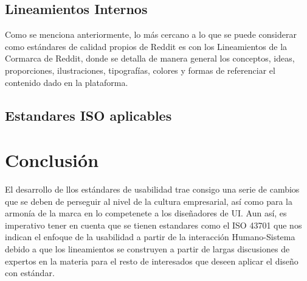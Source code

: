 \subsection{Lineamientos Internos}
Como se menciona anteriormente, lo más cercano a lo que se puede considerar como estándares de calidad
propios de Reddit es con los Lineamientos de la Cormarca de Reddit, donde se detalla de manera general
los conceptos, ideas, proporciones, ilustraciones, tipografías, colores y formas de referenciar el
contenido dado en la plataforma.

\subsection{Estandares ISO aplicables}

\section{Conclusión}
El desarrollo de llos estándares de usabilidad trae consigo una serie de cambios que se deben de perseguir
al nivel de la cultura empresarial, así como para la armonía de la marca en lo competenete a los diseñadores de UI.
Aun así, es imperativo tener en cuenta que se tienen estandares como el ISO 43701 que nos indican el enfoque de la usabilidad
a partir de la interacción Humano-Sistema debido a que los lineamientos se construyen a partir de largas discusiones
de expertos en la materia para el resto de interesados que deseen aplicar el diseño con estándar.



